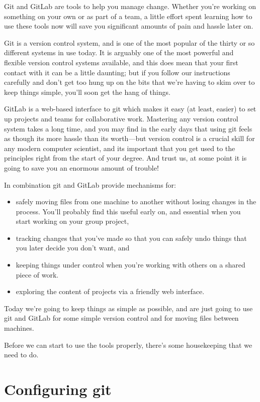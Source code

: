 Git and GitLab are tools to help you manage change. Whether you're working on something on your own or as part of a team, a little effort spent learning how to use these tools now will save you significant amounts of pain and hassle later on. 

Git is a version control system, and is one of the most popular of the thirty or so different systems in use today. It is arguably one of the most powerful and flexible version control systems available, and this does mean that your first contact with it can be a little daunting; but if you follow our instructions carefully and don't get too hung up on the bits that we're having to skim over to keep things simple, you'll soon get the hang of things. 

GitLab is a web-based interface to git which makes it easy (at least, easier) to set up projects and teams for collaborative work. Mastering any version control system takes a long time, and you may find in the early days that using git feels as though its more hassle than its worth---but version control is a crucial skill for any modern computer scientist, and its important that you get used to the principles right from the start of your degree. And trust us, at some point it is going to save you an enormous amount of trouble!

In combination git and GitLab provide mechanisms for:
\begin{itemize}
\item safely moving files from one machine to another without losing changes in the process. You'll probably find this useful early on, and essential when you start working on your group project,
\item tracking changes that you've made so that you can safely undo things that you later decide you don't want, and
\item keeping things under control when you're working with others on a shared piece of work.
\item exploring the content of projects via a friendly web interface.
\end{itemize}

Today we're going to keep things as simple as possible, and are just going to use git and GitLab for some simple version control and for moving files between machines.

Before we can start to use the tools properly, there's some housekeeping that we need to do. 

\section{Configuring git}

